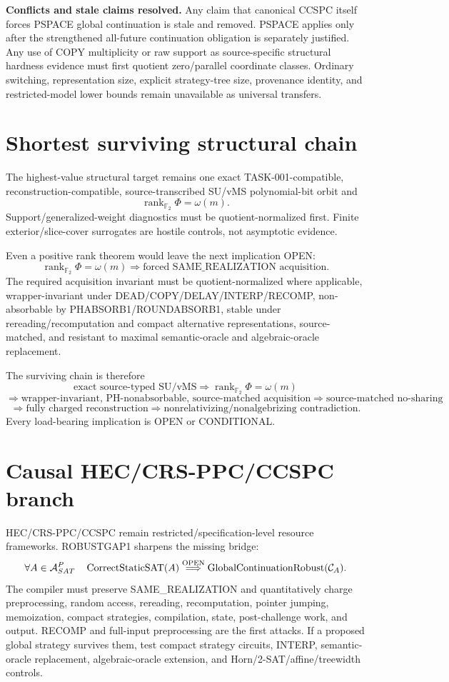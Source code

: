 \documentclass[11pt]{article}
\begin{document}
\textbf{Conflicts and stale claims resolved.}
Any claim that canonical CCSPC itself forces PSPACE global continuation is stale and removed. PSPACE applies only after the strengthened all-future continuation obligation is separately justified. Any use of COPY multiplicity or raw support as source-specific structural hardness evidence must first quotient zero/parallel coordinate classes. Ordinary switching, representation size, explicit strategy-tree size, provenance identity, and restricted-model lower bounds remain unavailable as universal transfers.

\section*{Shortest surviving structural chain}
The highest-value structural target remains one exact TASK-001-compatible, reconstruction-compatible, source-transcribed SU/vMS polynomial-bit orbit and
\[
\boxed{\operatorname{rank}_{\mathbb F_2}\Phi=\omega(m)}.
\]
Support/generalized-weight diagnostics must be quotient-normalized first. Finite exterior/slice-cover surrogates are hostile controls, not asymptotic evidence.

Even a positive rank theorem would leave the next implication OPEN:
\[
\operatorname{rank}_{\mathbb F_2}\Phi=\omega(m)
\Longrightarrow
\boxed{\text{forced SAME\_REALIZATION acquisition}}.
\]
The required acquisition invariant must be quotient-normalized where applicable, wrapper-invariant under DEAD/COPY/DELAY/INTERP/RECOMP, non-absorbable by PHABSORB1/ROUNDABSORB1, stable under rereading/recomputation and compact alternative representations, source-matched, and resistant to maximal semantic-oracle and algebraic-oracle replacement.

The surviving chain is therefore
\[
\text{exact source-typed SU/vMS}
\Longrightarrow
\operatorname{rank}_{\mathbb F_2}\Phi=\omega(m)
\]
\[
\Longrightarrow
\text{wrapper-invariant, PH-nonabsorbable, source-matched acquisition}
\Longrightarrow
\text{source-matched no-sharing}
\]
\[
\Longrightarrow
\text{fully charged reconstruction}
\Longrightarrow
\text{nonrelativizing/nonalgebrizing contradiction}.
\]
Every load-bearing implication is OPEN or CONDITIONAL.

\section*{Causal HEC/CRS-PPC/CCSPC branch}
HEC/CRS-PPC/CCSPC remain restricted/specification-level resource frameworks. ROBUSTGAP1 sharpens the missing bridge:
\[
\forall A\in{\cal A}^{P}_{SAT}\quad
\operatorname{CorrectStaticSAT}(A)
\overset{\rm OPEN}{\Longrightarrow}
\operatorname{GlobalContinuationRobust}({\cal C}_A).
\]
The compiler must preserve SAME_REALIZATION and quantitatively charge preprocessing, random access, rereading, recomputation, pointer jumping, memoization, compact strategies, compilation, state, post-challenge work, and output. RECOMP and full-input preprocessing are the first attacks. If a proposed global strategy survives them, test compact strategy circuits, INTERP, semantic-oracle replacement, algebraic-oracle extension, and Horn/2-SAT/affine/treewidth controls.
\end{document}
